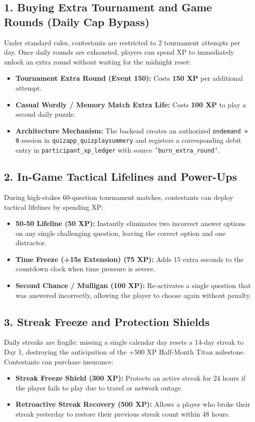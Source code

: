 \subsection{1. Buying Extra Tournament and Game Rounds (Daily Cap Bypass)}
Under standard rules, contestants are restricted to 2 tournament attempts per day. Once daily rounds are exhausted, players can spend XP to immediately unlock an extra round without waiting for the midnight reset:
\begin{itemize}
    \item \textbf{Tournament Extra Round (Event 150):} Costs \textbf{150 XP} per additional attempt.
    \item \textbf{Casual Wordly / Memory Match Extra Life:} Costs \textbf{100 XP} to play a second daily puzzle.
    \item \textbf{Architecture Mechanism:} The backend creates an authorized \texttt{ondemand > 0} session in \texttt{quizapp\_quizplaysummery} and registers a corresponding debit entry in \texttt{participant\_xp\_ledger} with source \texttt{'burn\_extra\_round'}.
\end{itemize}

\subsection{2. In-Game Tactical Lifelines and Power-Ups}
During high-stakes 60-question tournament matches, contestants can deploy tactical lifelines by spending XP:
\begin{itemize}
    \item \textbf{50-50 Lifeline (50 XP):} Instantly eliminates two incorrect answer options on any single challenging question, leaving the correct option and one distractor.
    \item \textbf{Time Freeze (+15s Extension) (75 XP):} Adds 15 extra seconds to the countdown clock when time pressure is severe.
    \item \textbf{Second Chance / Mulligan (100 XP):} Re-activates a single question that was answered incorrectly, allowing the player to choose again without penalty.
\end{itemize}

\subsection{3. Streak Freeze and Protection Shields}
Daily streaks are fragile: missing a single calendar day resets a 14-day streak to Day 1, destroying the anticipation of the $+500\text{ XP}$ Half-Month Titan milestone. Contestants can purchase insurance:
\begin{itemize}
    \item \textbf{Streak Freeze Shield (300 XP):} Protects an active streak for 24 hours if the player fails to play due to travel or network outage.
    \item \textbf{Retroactive Streak Recovery (500 XP):} Allows a player who broke their streak yesterday to restore their previous streak count within 48 hours.
\end{itemize}

